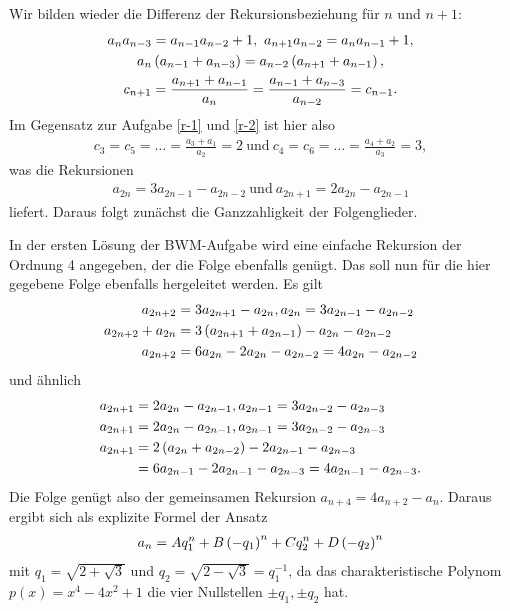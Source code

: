 \documentclass[11pt,a4paper]{article}
\begin{document}
\begin{loesung}
Wir bilden wieder die Differenz der Rekursionsbeziehung für $n$ und $n+1$:
\begin{gather*}
  a_na_{n-3}=a_{n-1}a_{n-2}+1,\ a_{n+1}a_{n-2}=a_na_{n-1}+1,\\
  a_n\left(a_{n-1}+a_{n-3}\right)=a_{n-2}\left(a_{n+1}+a_{n-1}\right),\\
  c_{n+1}=\frac{a_{n+1}+a_{n-1}}{a_n}=\frac{a_{n-1}+a_{n-3}}{a_{n-2}}=c_{n-1}.
\end{gather*}
Im Gegensatz zur Aufgabe \ref{r-1} und \ref{r-2} ist hier also
\begin{gather*}
  c_3=c_5=\dots=\frac{a_3+a_1}{a_2}=2\ \text{und}\
  c_4=c_6=\dots=\frac{a_4+a_2}{a_3}=3, 
\end{gather*}
was die Rekursionen
\begin{gather*}
  a_{2n}=3a_{2n-1}-a_{2n-2}\ \text{und}\ a_{2n+1}=2a_{2n}-a_{2n-1}
\end{gather*}
liefert.  Daraus folgt zunächst die Ganzzahligkeit der Folgenglieder.

In der ersten Lösung der BWM-Aufgabe wird eine einfache Rekursion der Ordnung
4 angegeben, der die Folge ebenfalls genügt.  Das soll nun für die hier
gegebene Folge ebenfalls hergeleitet werden.  Es gilt
\begin{align*}
  a_{2n+2}&=3a_{2n+1}-a_{2n}, a_{2n}=3a_{2n-1}-a_{2n-2}\\
  a_{2n+2}+a_{2n}&=3\left(a_{2n+1}+a_{2n-1}\right)-a_{2n}-a_{2n-2}\\
  a_{2n+2}&=6a_{2n}-2a_{2n}-a_{2n-2}=4a_{2n}-a_{2n-2} 
\end{align*}
und ähnlich
\begin{align*}
  a_{2n+1}&=2a_{2n}-a_{2n-1}, a_{2n-1}=3a_{2n-2}-a_{2n-3}\\
  a_{2n+1}&=2a_{2n}-a_{2n-1}, a_{2n-1}=3a_{2n-2}-a_{2n-3}\\
  a_{2n+1}&=2\left(a_{2n}+a_{2n-2}\right)-2a_{2n-1}-a_{2n-3}\\
  &=6a_{2n-1}-2a_{2n-1}-a_{2n-3}=4a_{2n-1}-a_{2n-3}. 
\end{align*}
Die Folge genügt also der gemeinsamen Rekursion $a_{n+4}=4a_{n+2}-a_n$.
Daraus ergibt sich als explizite Formel der Ansatz 
\begin{gather*}
  a_n=Aq_1^n+B\left(-q_1\right)^n+Cq_2^n+D\left(-q_2\right)^n
\end{gather*}
mit $q_1=\sqrt{2+\sqrt{3}}$ und $q_2=\sqrt{2-\sqrt{3}}=q_1^{-1}$, da das
charakteristische Polynom $p(x)=x^4-4x^2+1$ die vier Nullstellen $\pm q_1, \pm
q_2$ hat.
\end{loesung}
\end{document}
